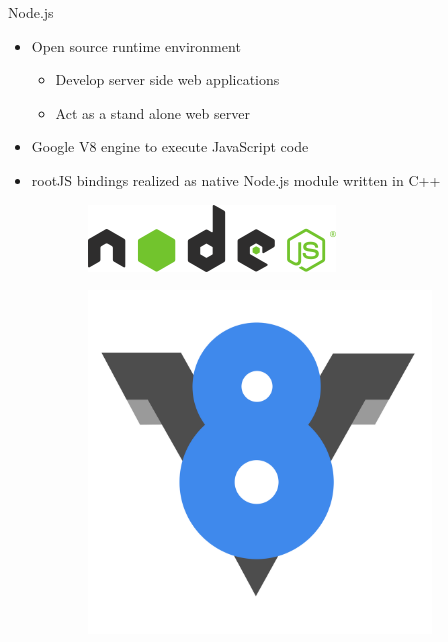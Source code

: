 \begin{frame}{Node.js}
  \begin{itemize}
    \item Open source runtime environment
    \begin{itemize}
      \item Develop server side web applications
      \item Act as a stand alone web server
    \end{itemize}
    \item Google V8 engine to execute JavaScript code
    \item rootJS bindings realized as native Node.js module written in C++
  \end{itemize}

  \begin{figure}[htb]
    \centering
    \begin{subfigure}[b]{0.33\textwidth}
      \includegraphics[width=\linewidth, keepaspectratio]{./resources/nodejs-light.png}
      \nocite{nodejs:logo}
      \vspace{10mm}
    \end{subfigure}%
    \begin{subfigure}[b]{0.33\textwidth}
        \includegraphics[width=\linewidth, keepaspectratio]{./resources/v8.png}

\end{subfigure}
\end{figure}
\end{frame}
